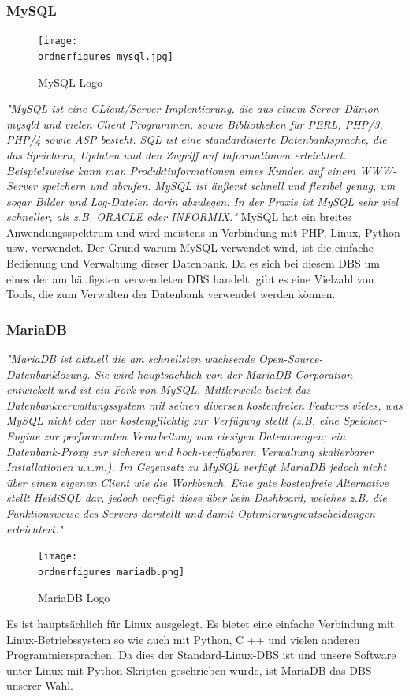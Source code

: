 \subsubsection{MySQL}
\begin{figure}
	\centering
	\texttt{[image: \\ordnerfigures mysql.jpg]}
	\caption{ MySQL Logo}
	\label{fig:mysql}
	\cite{MySQLlogo}
\end{figure}
\textit{"MySQL ist eine CLient/Server
Implentierung, die aus einem Server-Dämon mysqld und vielen Client Programmen, sowie
Bibliotheken für PERL, PHP/3, PHP/4 sowie ASP besteht.
SQL ist eine standardisierte Datenbanksprache, die das Speichern, Updaten und den Zugriff auf
Informationen erleichtert. Beispielsweise kann man Produktinformationen eines Kunden auf einem
WWW-Server speichern und abrufen. MySQL ist äußerst schnell und flexibel genug, um sogar Bilder
und Log-Dateien darin abzulegen. In der Praxis ist MySQL sehr viel schneller, als z.B. ORACLE oder INFORMIX."}\cite{stepken1999mysql}
\bigbreak
MySQL hat ein breites Anwendungsspektrum und wird meistens in Verbindung mit PHP, Linux, Python usw. verwendet. Der Grund warum MySQL verwendet wird, ist die einfache Bedienung und Verwaltung dieser Datenbank. Da es sich bei diesem DBS um eines der am häufigsten verwendeten DBS handelt, gibt es eine Vielzahl von Tools, die zum Verwalten der Datenbank verwendet werden können.

\subsubsection{MariaDB}
\textit{"MariaDB ist aktuell die am schnellsten wachsende Open-Source-Datenbanklösung. Sie wird hauptsächlich von der MariaDB Corporation entwickelt und ist ein Fork von MySQL. Mittlerweile bietet das Datenbankverwaltungssystem mit seinen diversen kostenfreien Features vieles, was MySQL nicht oder nur kostenpflichtig zur Verfügung stellt (z.B. eine Speicher-Engine zur performanten Verarbeitung von riesigen Datenmengen; ein Datenbank-Proxy zur sicheren und hoch-verfügbaren Verwaltung skalierbarer Installationen u.v.m.). Im Gegensatz zu MySQL verfügt MariaDB jedoch nicht über einen eigenen Client wie die Workbench. Eine gute kostenfreie Alternative stellt HeidiSQL dar, jedoch verfügt diese über kein Dashboard, welches z.B. die Funktionsweise des Servers darstellt und damit Optimierungsentscheidungen erleichtert."}\cite{MariaDB-Monitor}
\begin{figure}[h]
	\centering
	\texttt{[image: \\ordnerfigures mariadb.png]}
	\caption{ MariaDB Logo}
	\label{fig:mariadb}
	\cite{MariaDBlogo}
\end{figure}
\bigbreak
Es ist hauptsächlich für Linux ausgelegt. Es bietet eine einfache Verbindung mit Linux-Betriebssystem so wie auch mit Python, C ++ und vielen anderen Programmiersprachen. Da dies der Standard-Linux-DBS ist und unsere Software unter Linux mit Python-Skripten geschrieben wurde, ist MariaDB das DBS unserer Wahl.

